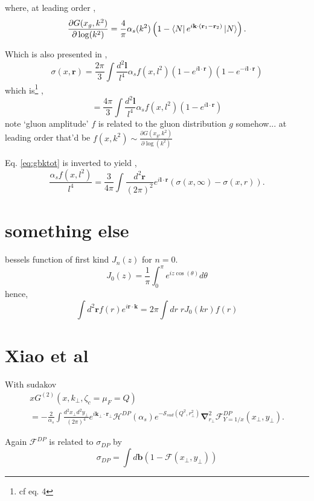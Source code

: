 \documentclass[12pt]{article}
\newcommand{\pairdot}[2]{ \mathbf{#1}\cdot\mathbf{#2}  }
\begin{document}
where, at leading order \cite{nikolaev1994},
\begin{equation}
\frac{\partial G(x_g,k^2)}{\partial \log(k^2)}=\frac{4}{\pi}\alpha_s(k^2) \left(1-\bra{N}e^{i\mathbf{k}\cdot (\mathbf{r}_1-\mathbf{r}_2)}\ket{N}\right).
\end{equation}



Which is also presented in \cite{gbk2002},
\begin{equation}
\sigma(x,\mathbf{r})=\frac{2\pi}{3}\int\frac{d^2 \mathbf{l}}{l^4}\alpha_s f(x,l^2) (1-e^{i \pairdot{l}{r}})(1-e^{-i \pairdot{l}{r}})
\end{equation}
which is\footnote{ cf \cite{ivanov2002} eq. 4} ,
\begin{equation}
=\frac{4\pi}{3}\int\frac{d^2 \mathbf{l}}{l^4}\alpha_s f(x,l^2) (1-e^{i \pairdot{l}{r}})
\label{eq:gbktot}
\end{equation}
note `gluon amplitude' $f$ is related to  the gluon distribution $g$ somehow... 
at leading order that'd be $f(x,k^2)\sim  \frac{\partial G(x_g,k^2)}{\partial \log(k^2)}$ 


Eq. \ref{eq:gbktot} is inverted to yield \cite{gbk2002},
\begin{equation}
\frac{ \alpha_s f(x,l^2)}{l^4}=\frac{3}{4\pi} \int\frac{d^2 \mathbf{r}}{(2\pi)^2} e^{i\pairdot{l}{r}}\left(\sigma(x,\infty)-\sigma(x,r)\right).
\end{equation}

\section{something else}
bessels function of first kind $J_n(z)$ for $n=0$.
\begin{equation}
J_0(z)=\frac{1}{\pi}\int^\pi_0 e^{i z \cos(\theta)}d\theta
\end{equation}
hence,
\begin{equation}
\int d^2\mathbf{r} f(r) e^{i \mathbf{r}\cdot \mathbf{k}}=2\pi \int dr \;r J_0(kr) f(r)
\end{equation}



\section{Xiao et al \cite{xiao2017}}
With sudakov
\begin{multline}
xG^{(2)}(x,k_{\perp},\zeta_c=\mu_F=Q)\\
=- \frac{2}{\alpha_s}\int\frac{d^2x_\perp d^2 y_\perp}{(2 \pi)^4} e^{i \pairdot{k_\perp}{r_\perp}}\mathcal{H}^{DP}(\alpha_s)e^{-\mathcal{S}_{sud}(Q^2,r^2_\perp)}
\mathbf{\nabla}^2_{r_\perp}\mathcal{F}^{DP}_{Y=1/x}(x_\perp, y_\perp).
\end{multline}

Again $\mathcal{F}^{DP}$ is related to $\sigma_{DP}$ by 
\begin{equation}
\sigma_{DP}=\int d\mathbf{b}(1-\mathcal{F}(x_\perp,y_\perp))
\end{equation} 



\newpage
\printbibliography
\end{document}
